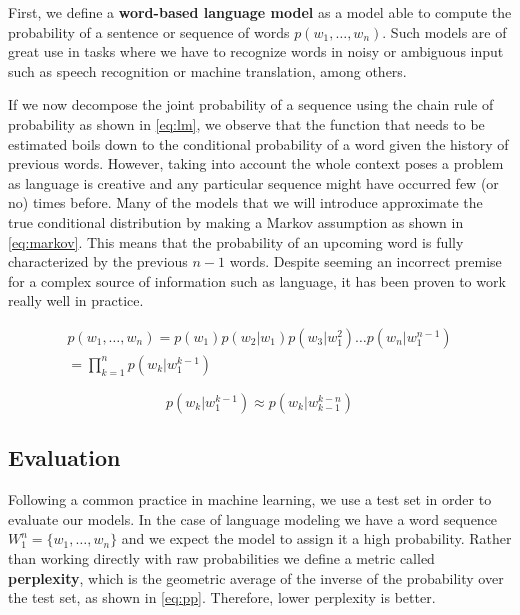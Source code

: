 First, we define a \textbf{word-based language model} as a model able to compute the probability of a sentence or sequence of words $p(w_1, \ldots ,w_n)$. Such models are of great use in tasks where we have to recognize words in noisy or ambiguous input such as speech recognition or machine translation, among others.

If we now decompose the joint probability of a sequence using the chain rule of probability as shown in \autoref{eq:lm}, we observe that the function that needs to be estimated boils down to the conditional probability of a word given the history of previous words. However, taking into account the whole context poses a problem as language is creative and any particular sequence might have occurred few (or no) times before.  Many of the models that we will introduce approximate the true conditional distribution by making a Markov assumption as shown in \autoref{eq:markov}. This means that the probability of an upcoming word is fully characterized by the previous $n-1$ words. Despite seeming an incorrect premise for a complex source of information such as language, it has been proven to work really well in practice.

\begin{equation} \label{eq:lm}
	\begin{gathered}
		p(w_1, \ldots ,w_n)=p(w_1)p(w_2|w_1)p(w_3|w_{1}^{2}) \ldots p(w_n|w_{1}^{n-1}) \\
		= \prod_{k=1}^{n} p(w_k|w_{1}^{k-1})
	\end{gathered}
\end{equation}

\begin{equation} \label{eq:markov}
	p(w_k|w_{1}^{k-1}) \approx p(w_k|w_{k-1}^{k-n})
\end{equation}

\subsection{Evaluation}

Following a common practice in machine learning, we use a test set in order to evaluate our models. In the case of language modeling we have a word sequence $W_1^n=\{w_1, \ldots , w_n\}$ and we expect the model to assign it a high probability. Rather than working directly with raw probabilities we define a metric called \textbf{perplexity}, which is the geometric average of the inverse of the probability over the test set, as shown in \autoref{eq:pp}. Therefore, lower perplexity is better.

